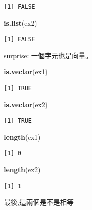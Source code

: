 \documentclass[]{book}
\newenvironment{Shaded}{\begin{snugshade}}{\end{snugshade}}
\newcommand{\KeywordTok}[1]{\textcolor[rgb]{0.13,0.29,0.53}{\textbf{#1}}}
\newcommand{\NormalTok}[1]{#1}
\theoremstyle{definition}
\theoremstyle{definition}
\theoremstyle{definition}
\theoremstyle{remark}
\begin{document}
\begin{verbatim}
[1] FALSE
\end{verbatim}

\begin{Shaded}
\begin{Highlighting}[]
\KeywordTok{is.list}\NormalTok{(ex2)}
\end{Highlighting}
\end{Shaded}

\begin{verbatim}
[1] FALSE
\end{verbatim}

surprise: 一個字元也是向量。

\begin{Shaded}
\begin{Highlighting}[]
\KeywordTok{is.vector}\NormalTok{(ex1)}
\end{Highlighting}
\end{Shaded}

\begin{verbatim}
[1] TRUE
\end{verbatim}

\begin{Shaded}
\begin{Highlighting}[]
\KeywordTok{is.vector}\NormalTok{(ex2)}
\end{Highlighting}
\end{Shaded}

\begin{verbatim}
[1] TRUE
\end{verbatim}

\begin{Shaded}
\begin{Highlighting}[]
\KeywordTok{length}\NormalTok{(ex1)}
\end{Highlighting}
\end{Shaded}

\begin{verbatim}
[1] 0
\end{verbatim}

\begin{Shaded}
\begin{Highlighting}[]
\KeywordTok{length}\NormalTok{(ex2)}
\end{Highlighting}
\end{Shaded}

\begin{verbatim}
[1] 1
\end{verbatim}

最後,這兩個是不是相等
\end{document}
